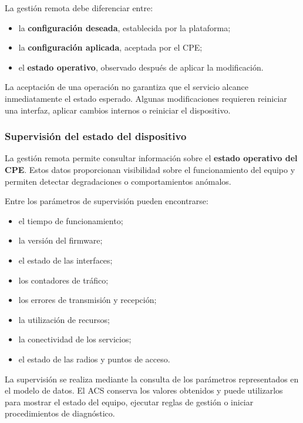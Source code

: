 La gestión remota debe diferenciar entre:

\begin{itemize}
    \item la \textbf{configuración deseada}, establecida por la
    plataforma;

    \item la \textbf{configuración aplicada}, aceptada por el CPE;

    \item el \textbf{estado operativo}, observado después de aplicar la
    modificación.
\end{itemize}

La aceptación de una operación no garantiza que el servicio alcance
inmediatamente el estado esperado. Algunas modificaciones requieren
reiniciar una interfaz, aplicar cambios internos o reiniciar el
dispositivo.


\subsubsection*{Supervisión del estado del dispositivo}

La gestión remota permite consultar información sobre el
\textbf{estado operativo del CPE}. Estos datos proporcionan visibilidad
sobre el funcionamiento del equipo y permiten detectar degradaciones o
comportamientos anómalos.

Entre los parámetros de supervisión pueden encontrarse:

\begin{itemize}
    \item el tiempo de funcionamiento;
    \item la versión del firmware;
    \item el estado de las interfaces;
    \item los contadores de tráfico;
    \item los errores de transmisión y recepción;
    \item la utilización de recursos;
    \item la conectividad de los servicios;
    \item el estado de las radios y puntos de acceso.
\end{itemize}

La supervisión se realiza mediante la consulta de los parámetros
representados en el modelo de datos. El ACS conserva los valores obtenidos
y puede utilizarlos para mostrar el estado del equipo, ejecutar reglas de
gestión o iniciar procedimientos de diagnóstico.


